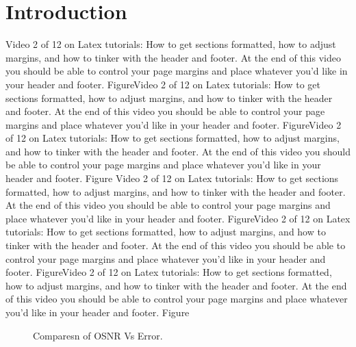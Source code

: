 \documentclass[12pt]{report}
\begin{document}
\section{Introduction}
Video 2 of 12 on Latex tutorials: How to get sections formatted, how to adjust margins, and how to tinker with the header and footer. At the end of this video you should be able to control your page margins and place whatever you'd like in your header and footer. FigureVideo 2 of 12 on Latex tutorials: How to get sections formatted, how to adjust margins, and how to tinker with the header and footer. At the end of this video you should be able to control your page margins and place whatever you'd like in your header and footer. FigureVideo 2 of 12 on Latex tutorials: How to get sections formatted, how to adjust margins, and how to tinker with the header and footer. At the end of this video you should be able to control your page margins and place whatever you'd like in your header and footer. Figure Video 2 of 12 on Latex tutorials: How to get sections formatted, how to adjust margins, and how to tinker with the header and footer. At the end of this video you should be able to control your page margins and place whatever you'd like in your header and footer. FigureVideo 2 of 12 on Latex tutorials: How to get sections formatted, how to adjust margins, and how to tinker with the header and footer. At the end of this video you should be able to control your page margins and place whatever you'd like in your header and footer. FigureVideo 2 of 12 on Latex tutorials: How to get sections formatted, how to adjust margins, and how to tinker with the header and footer. At the end of this video you should be able to control your page margins and place whatever you'd like in your header and footer. Figure
\begin{figure}[htbp]
	\caption{Comparesn of OSNR Vs Error.}
	\label{fig1}
\end{figure}
\end{document}
